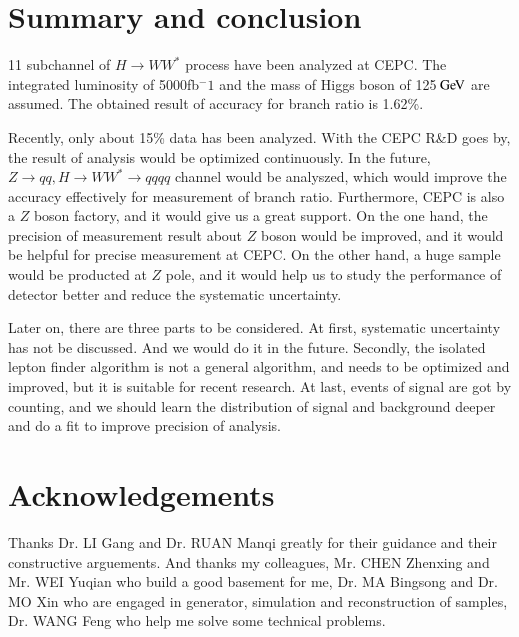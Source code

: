 \documentclass[11pt,a4paper]{cepcnote}
\begin{document}
%
%
\section{Summary and conclusion}
11 subchannel of $H\rightarrow WW^*$ process have been analyzed at CEPC. The integrated luminosity of 5000fb$^-1$ and the mass 
of Higgs boson of 125$\gev$ are assumed. The obtained result of accuracy for branch ratio is 1.62\%.

Recently, only about 15\% data has been analyzed. With the CEPC R\&D goes by, the result of analysis would be optimized continuously. 
In the future, $Z\rightarrow qq, H\rightarrow WW^*\rightarrow qqqq$ channel would be analyszed, which would improve the accuracy effectively 
for measurement of branch ratio. Furthermore, CEPC is also a $Z$ boson factory, and it would give us a great support. 
On the one hand, the precision of measurement result about $Z$ boson would be improved, and it would be helpful for precise 
measurement at CEPC. On the other hand, a huge sample would be producted at $Z$ pole, and it would help us to study the 
performance of detector better and reduce the systematic uncertainty.

Later on, there are three parts to be considered. At first, systematic uncertainty has not be discussed. 
And we would do it in the future. Secondly, the isolated lepton finder algorithm is not a general algorithm, and needs to be optimized and 
improved, but it is suitable for recent research. At last, events of signal are got by counting, and we should learn the distribution of 
signal and background deeper and do a fit to improve precision of analysis.
%

\section{Acknowledgements}

Thanks Dr. LI Gang and Dr. RUAN Manqi greatly for their guidance and their constructive arguements.
And thanks my colleagues, Mr. CHEN Zhenxing and Mr. WEI Yuqian who build a good basement for me, 
Dr. MA Bingsong and Dr. MO Xin who are engaged in generator, simulation and reconstruction of samples, 
Dr. WANG Feng who help me solve some technical problems.
\end{document}
